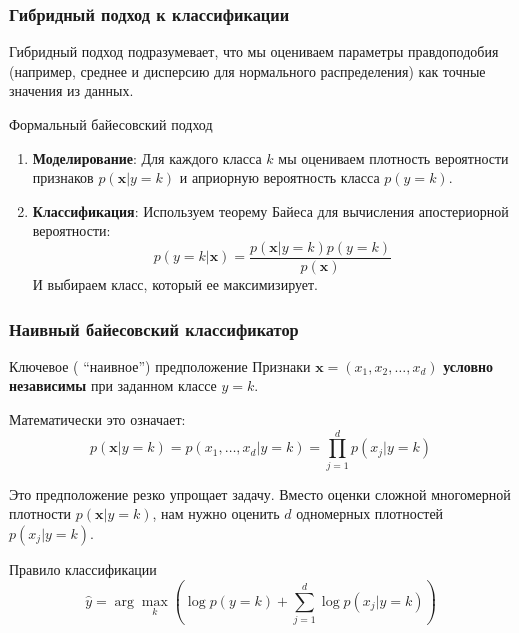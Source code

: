\documentclass[notheorems, handout]{beamer}
\newcommand{\vect}[1]{\mathbf{#1}}
\begin{document}
\begin{frame}
  \frametitle{Гибридный  подход к классификации}
  Гибридный подход подразумевает, что мы оцениваем параметры правдоподобия (например, среднее и дисперсию для нормального распределения) как точные значения из данных.
  \begin{block}{Формальный байесовский подход }
    \begin{enumerate}
      \item \textbf{Моделирование}: Для каждого класса $k$ мы оцениваем плотность вероятности признаков $p(\vect{x}|y=k)$ и априорную вероятность класса $p(y=k)$.
      \item \textbf{Классификация}: Используем теорему Байеса для вычисления апостериорной вероятности:
      $$ p(y=k|\vect{x}) = \frac{p(\vect{x}|y=k) p(y=k)}{p(\vect{x})} $$
      И выбираем класс, который ее максимизирует.
    \end{enumerate}
  \end{block}
\end{frame}
\begin{frame}
  \frametitle{Наивный байесовский классификатор}
  \begin{block}{Ключевое ( ``наивное'') предположение}
  Признаки $\vect{x} = (x_1, x_2, \dots, x_d)$ \textbf{условно независимы} при заданном классе $y=k$.
  \end{block}
  Математически это означает:
  $$ p(\vect{x}|y=k) = p(x_1, \dots, x_d|y=k) = \prod_{j=1}^{d} p(x_j|y=k) $$
  
  Это предположение резко упрощает задачу. Вместо оценки сложной многомерной плотности $p(\vect{x}|y=k)$, нам нужно оценить $d$ одномерных плотностей $p(x_j|y=k)$.
  
  \begin{block}{Правило классификации}
  $$ \hat{y} = \arg\max_k \left( \log p(y=k) + \sum_{j=1}^{d} \log p(x_j|y=k) \right) $$
  \end{block}
\end{frame}
\end{document}
